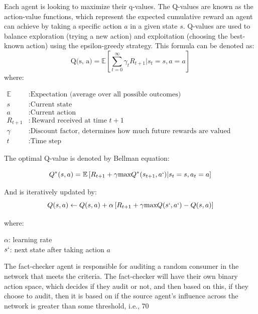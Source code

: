 \documentclass[twoside]{article}
\begin{document}
Each agent is looking to maximize their q-values. The Q-values are known as the action-value functions, which represent the expected cumulative reward an agent can achieve by taking a specific action $a$ in a given state $s$. Q-values are used to balance exploration (trying a new action) and exploitation (choosing the best-known action) using the epsilon-greedy strategy. This formula can be denoted as:
\[
\text{Q(s, a)} = \mathbb{E}\left[\sum_{t=0}^{\infty}\gamma_{t}R_{t + 1} | s_{t} = s, a = a\right]
\]
where:

\[
\begin{aligned}
\mathbb{E} &: \text{Expectation (average over all possible outcomes)} \\
s &: \text{Current state} \\
a &: \text{Current action} \\
R_{t+1} &: \text{Reward received at time } t+1 \\
\gamma &: \text{Discount factor, determines how much future rewards are valued compared to immediate rewards} \\
t &: \text{Time step}
\end{aligned}
\]

The optimal Q-value is denoted by Bellman equation:

\[
Q^{*}(s, a) = \mathbb{E} \left[R_{t+1} + \gamma\text{max}Q^{*}(s_{t+1}, a`) | s_{t} = s, a_{t} = a\right]
\]

And is iteratively updated by:
\[
Q(s, a) \leftarrow Q(s, a) + \alpha \left[R_{t+1} + \gamma\text{max}Q(s`,a`) - Q(s, a)\right]
\]

where:

$\alpha$: learning rate\\
$s`$: next state after taking action $a$


The fact-checker agent is responsible for auditing a random consumer in the network that meets the criteria. The fact-checker will have their own binary action space, which decides if they audit or not, and then based on this, if they choose to audit, then it is based on if the source agent's influence across the network is greater than some threshold, i.e., 70%
\end{document}
